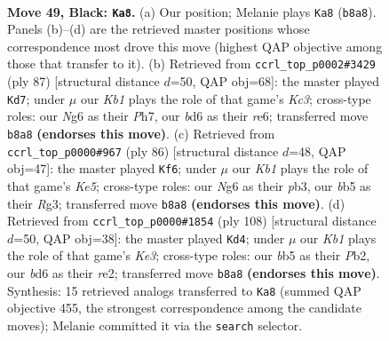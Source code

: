 \documentclass[11pt]{article}
\begin{document}
\clearpage

\begin{figure}[p]\centering
\begin{subfigure}{0.46\textwidth}\centering
\resizebox{\linewidth}{!}{%
\newchessgame
\chessboard[
  setfen={1k4r1/p7/PpRB2nb/1B3p2/5P2/4pK2/8/8 b - - 3 49},
  showmover=false,
  pgfstyle=straightmove, color=movearrow, markmove={b8-a8}
]}
\caption{}
\end{subfigure}\hfill
\begin{subfigure}{0.46\textwidth}\centering
\resizebox{\linewidth}{!}{%
\newchessgame
\chessboard[
  setfen={8/7p/2k1R1p1/2b5/1pB2BP1/7P/Pr3n2/5K2 b - - 8 44},
  showmover=false,
  pgfstyle=straightmove, color=movearrow, markmove={c6-d7}
]}
\caption{}
\end{subfigure}
\\[4pt]
\begin{subfigure}{0.46\textwidth}\centering
\resizebox{\linewidth}{!}{%
\newchessgame
\chessboard[
  setfen={4r3/7p/p1k3bP/P2NK3/4P3/1p4R1/1P4P1/8 w - - 1 44},
  showmover=false,
  pgfstyle=straightmove, color=movearrow, markmove={e5-f6}
]}
\caption{}
\end{subfigure}\hfill
\begin{subfigure}{0.46\textwidth}\centering
\resizebox{\linewidth}{!}{%
\newchessgame
\chessboard[
  setfen={8/1R4p1/5p2/2B2k2/2p2P1P/2PbK3/1P2r3/8 w - - 23 55},
  showmover=false,
  pgfstyle=straightmove, color=movearrow, markmove={e3-d4}
]}
\caption{}
\end{subfigure}
\caption{\textbf{Move 49, Black: \texttt{Ka8}.} (a) Our position; Melanie plays \texttt{Ka8} (\texttt{b8a8}). Panels (b)--(d) are the retrieved master positions whose correspondence most drove this move (highest QAP objective among those that transfer to it). (b) Retrieved from \texttt{ccrl\_top\_p0002\#3429} (ply 87) [structural distance $d$=50, QAP obj=68]: the master played \texttt{Kd7}; under $\mu$ our \emph{Kb1} plays the role of that game's \emph{Kc3}; cross-type roles: our \emph{N}g6 as their \emph{P}h7, our \emph{b}d6 as their \emph{r}e6; transferred move \texttt{b8a8} \textbf{(endorses this move)}. (c) Retrieved from \texttt{ccrl\_top\_p0000\#967} (ply 86) [structural distance $d$=48, QAP obj=47]: the master played \texttt{Kf6}; under $\mu$ our \emph{Kb1} plays the role of that game's \emph{Ke5}; cross-type roles: our \emph{N}g6 as their \emph{p}b3, our \emph{b}b5 as their \emph{R}g3; transferred move \texttt{b8a8} \textbf{(endorses this move)}. (d) Retrieved from \texttt{ccrl\_top\_p0000\#1854} (ply 108) [structural distance $d$=50, QAP obj=38]: the master played \texttt{Kd4}; under $\mu$ our \emph{Kb1} plays the role of that game's \emph{Ke3}; cross-type roles: our \emph{b}b5 as their \emph{P}b2, our \emph{b}d6 as their \emph{r}e2; transferred move \texttt{b8a8} \textbf{(endorses this move)}. Synthesis: 15 retrieved analogs transferred to \texttt{Ka8} (summed QAP objective 455, the strongest correspondence among the candidate moves); Melanie committed it via the \texttt{search} selector.}
\label{fig:thought-m97}
\end{figure}
\end{document}
